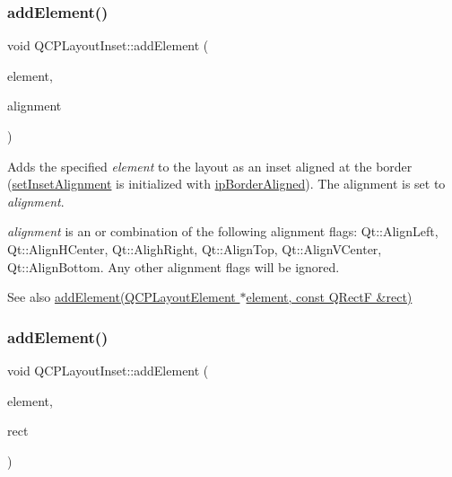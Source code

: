 \subsubsection{\texorpdfstring{add\+Element()}{addElement()}\hspace{0.1cm}{\footnotesize\ttfamily [1/2]}}
{\footnotesize\ttfamily void Q\+C\+P\+Layout\+Inset\+::add\+Element (\begin{DoxyParamCaption}\item[{\hyperlink{class_q_c_p_layout_element}{Q\+C\+P\+Layout\+Element} $\ast$}]{element,  }\item[{Qt\+::\+Alignment}]{alignment }\end{DoxyParamCaption})}

Adds the specified {\itshape element} to the layout as an inset aligned at the border (\hyperlink{class_q_c_p_layout_inset_a62882a4f9ad58bb0f53da12fde022abe}{set\+Inset\+Alignment} is initialized with \hyperlink{class_q_c_p_layout_inset_a8b9e17d9a2768293d2a7d72f5e298192a41ae236f04e42d7098e09fd49dffeb06}{ip\+Border\+Aligned}). The alignment is set to {\itshape alignment}.

{\itshape alignment} is an or combination of the following alignment flags\+: Qt\+::\+Align\+Left, Qt\+::\+Align\+H\+Center, Qt\+::\+Aligh\+Right, Qt\+::\+Align\+Top, Qt\+::\+Align\+V\+Center, Qt\+::\+Align\+Bottom. Any other alignment flags will be ignored.

\begin{DoxySeeAlso}{See also}
\hyperlink{class_q_c_p_layout_inset_a8ff61fbee4a1f0ff45c398009d9f1e56}{add\+Element(\+Q\+C\+P\+Layout\+Element $\ast$element, const Q\+Rect\+F \&rect)} 
\end{DoxySeeAlso}
\mbox{\label{class_q_c_p_layout_inset_a8ff61fbee4a1f0ff45c398009d9f1e56}} 
\subsubsection{\texorpdfstring{add\+Element()}{addElement()}\hspace{0.1cm}{\footnotesize\ttfamily [2/2]}}
{\footnotesize\ttfamily void Q\+C\+P\+Layout\+Inset\+::add\+Element (\begin{DoxyParamCaption}\item[{\hyperlink{class_q_c_p_layout_element}{Q\+C\+P\+Layout\+Element} $\ast$}]{element,  }\item[{const Q\+RectF \&}]{rect }\end{DoxyParamCaption})}

